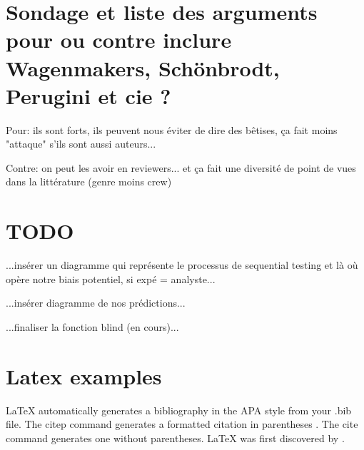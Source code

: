 \documentclass[a4paper,man,natbib]{apa6}
\begin{document}
\section{Sondage et liste des arguments pour ou contre inclure Wagenmakers, Schönbrodt, Perugini et cie ?}

Pour: ils sont forts, ils peuvent nous éviter de dire des bêtises, ça fait moins "attaque" s'ils sont aussi auteurs...	

Contre: on peut les avoir en reviewers... et ça fait une diversité de point de vues dans la littérature (genre moins crew)

\section{TODO}

...insérer un diagramme qui représente le processus de sequential testing et là où opère notre biais potentiel, si expé = analyste...

...insérer diagramme de nos prédictions...

...finaliser la fonction blind (en cours)...

\section{Latex examples}

LaTeX automatically generates a bibliography in the APA style from your .bib file. The citep command generates a formatted citation in parentheses \citep{Lamport1986}. The cite command generates one without parentheses. LaTeX was first discovered by \cite{Lamport1986}.



\end{document}
